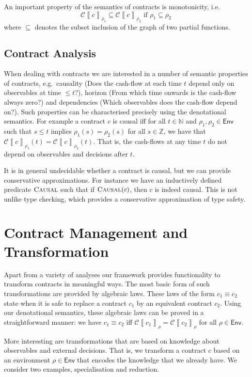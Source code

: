 \documentclass[a4paper,debug,twocolumn]{easychair}
\newcommand\type[1]{\mathsf{#1}}
\newcommand\nats{{\mathbb N}}
\newcommand\ints{{\mathbb Z}}
\newcommand\cSem[2]{{\mathcal C}\left\llbracket#1\right\rrbracket_{#2}}
\newcommand\Pred[1]{\textsc{#1}}
\theoremstyle{plain}
\begin{document}
An important property of the semantics of contracts is monotonicity,
i.e.
\[
\cSem c {\rho_1} \subseteq \cSem c {\rho_2} \text{ if }
\rho_1\subseteq \rho_2
\]
where $\subseteq$ denotes the subset inclusion of the graph of two
partial functions.

\subsection{Contract Analysis}
\label{sec:contract-analysis}

When dealing with contracts we are interested in a number of semantic
properties of contracts, e.g.\ causality (Does the cash-flow at each
time $t$ depend only on observables at time $\leq t$?), horizon (From
which time onwards is the cash-flow always zero?) and dependencies
(Which observables does the cash-flow depend on?). Such properties can
be characterised precisely using the denotational semantics. For
example a contract $c$ is causal iff for all $t \in \nats$ and
$\rho_1, \rho_2 \in \type{Env}$ such that $s \le t$ implies
$\rho_1(s)=\rho_2(s)$ for all $s \in \ints$, we have that $\cSem
c{\rho_1} (t) = \cSem c {\rho_2} (t)$. That is, the cash-flows at any
time $t$ do not depend on observables and decisions after $t$.

It is in general undecidable whether a contract is causal, but we
can provide conservative approximations.  For instance we have an
inductively defined predicate $\Pred{Causal}$ such that if
$\Pred{Causal}(c)$, then $c$ is indeed causal. This is not unlike type
checking, which provides a conservative approximation of type safety.


\section{Contract Management and Transformation}
\label{sec:contract-management}

Apart from a variety of analyses our framework provides functionality
to transform contracts in meaningful ways. The most basic form of such
transformations are provided by algebraic laws. These laws of the form
$c_1 \equiv c_2$ state when it is safe to replace a contract $c_1$ by
an equivalent contract $c_2$. Using our denotational semantics, these
algebraic laws can be proved in a straightforward manner: we have $c_1
\equiv c_2$ iff $\cSem{c_1}\rho = \cSem{c_2}\rho$ for all $\rho \in
\type{Env}$.

More interesting are transformations that are based on knowledge about
observables and external decisions. That is, we transform a contract
$c$ based on an environment $\rho \in \type{Env}$ that encodes the
knowledge that we already have. We consider two examples,
specialisation and reduction.
\end{document}
